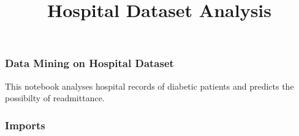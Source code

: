 \documentclass[11pt]{article}
\title{Hospital Dataset Analysis}
\begin{document}
    
    
    \maketitle
    
    

    
    \hypertarget{data-mining-on-hospital-dataset}{%
\subsubsection{Data Mining on Hospital
Dataset}\label{data-mining-on-hospital-dataset}}

This notebook analyses hospital records of diabetic patients and
predicts the possibilty of readmittance.

    \hypertarget{imports}{%
\subsubsection{Imports}\label{imports}}
\end{document}
